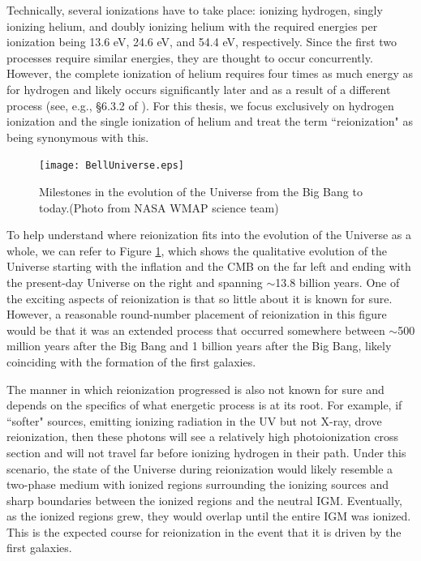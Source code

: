 Technically, several ionizations have to take place: ionizing hydrogen, singly ionizing helium, and doubly ionizing helium with the required energies per ionization being 13.6 eV, 24.6 eV, and 54.4 eV, respectively. Since the first two processes require similar energies, they are thought to occur concurrently. However, the complete ionization of helium requires four times as much energy as for hydrogen and likely occurs significantly later and as a result of a different process (see, e.g., \S 6.3.2 of \citealt{barkana2001beginning}). For this thesis, we focus exclusively on hydrogen ionization and the single ionization of helium and treat the term ``reionization" as being synonymous with this. 


\begin{figure}[!p]
  \centering
  \texttt{[image: BellUniverse.eps]}
  \caption{Milestones in the evolution of the Universe from the Big Bang to today.(Photo from NASA WMAP science team)}
  \label{fig:NASAWMAP}
\end{figure}


To help understand where reionization fits into the evolution of the Universe as a whole, we can refer to Figure \ref{fig:NASAWMAP}, which shows the qualitative evolution of the Universe starting with the inflation and the CMB on the far left and ending with the present-day Universe on the right and spanning $\sim$13.8 billion years. One of the exciting aspects of reionization is that so little about it is known for sure. However, a reasonable round-number placement of reionization in this figure would be that it was an extended process that occurred somewhere between $\sim$500 million years after the Big Bang and 1 billion years after the Big Bang, likely coinciding with the formation of the first galaxies. 


The manner in which reionization progressed is also not known for sure and depends on the specifics of what energetic process is at its root. For example, if ``softer" sources, emitting ionizing radiation in the UV but not X-ray, drove reionization, then these photons will see a relatively high photoionization cross section and will not travel far before ionizing hydrogen in their path. Under this scenario, the state of the Universe during reionization would likely resemble a two-phase medium with ionized regions surrounding the ionizing sources and sharp boundaries between the ionized regions and the neutral IGM. Eventually, as the ionized regions grew, they would overlap until the entire IGM was ionized. This is the expected course for reionization in the event that it is driven by the first galaxies.	


